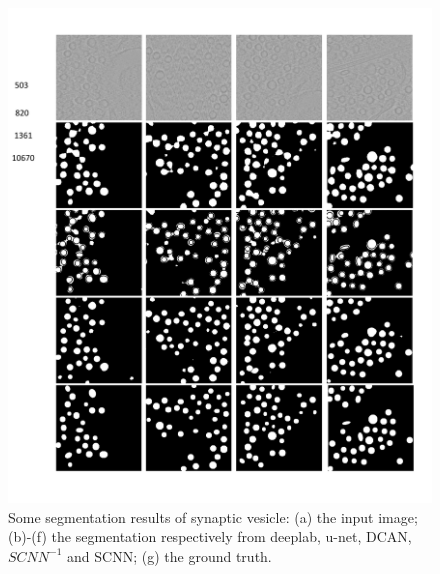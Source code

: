 \begin{figure}
    \begin{center}
        \includegraphics[width=7in]{figures/FigVesicle.pdf}
    \end{center}
    \caption{Some segmentation results of synaptic vesicle: (a) the input image; (b)-(f) the segmentation respectively from deeplab, u-net, DCAN, $SCNN^{-1}$ and SCNN; (g) the ground truth.}
    \label{FigVesicle}
\end{figure}

